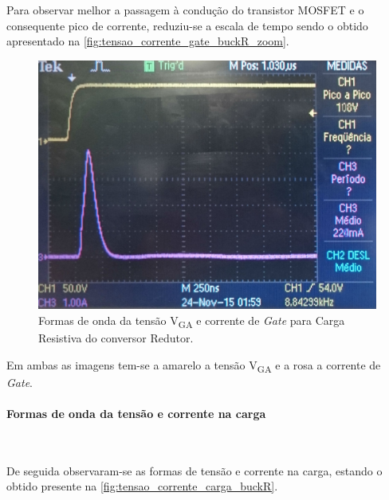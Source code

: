 \documentclass[a4paper,11pt]{article}
\numberwithin{equation}{section}
\begin{document}
Para observar melhor a passagem à condução do transistor MOSFET e o consequente pico de corrente, reduziu-se a escala de tempo sendo o obtido apresentado na \autoref{fig:tensao_corrente_gate_buckR_zoom}.

\begin{figure}[h]
	\centering
	\includegraphics[keepaspectratio=true, scale=0.13]{img/figs/tensao_corrente_gate_buckR_zoom}
	\caption{Formas de onda da tensão V\textsubscript{GA} e corrente de \textit{Gate} para Carga Resistiva do conversor Redutor.}
	\label{fig:tensao_corrente_gate_buckR_zoom}
	\vspace{-0.8em}
\end{figure} 

Em ambas as imagens tem-se a amarelo a tensão V\textsubscript{GA} e a rosa a corrente de \textit{Gate}.

\paragraph{Formas de onda da tensão e corrente na carga}\mbox{}\

De seguida observaram-se as formas de tensão e corrente na carga, estando o obtido presente na \autoref{fig:tensao_corrente_carga_buckR}.
\end{document}
